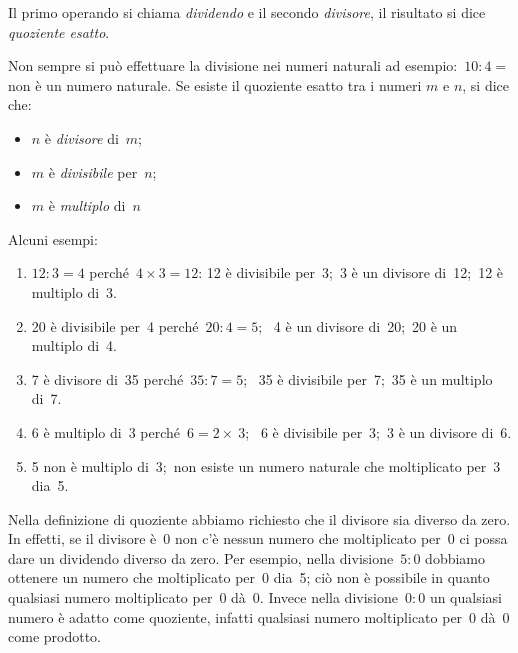 Il primo operando si chiama \emph{dividendo} e il secondo \emph{divisore}, 
il risultato si dice \emph{quoziente esatto}.

Non sempre si può effettuare la divisione nei numeri naturali ad 
esempio:~\(10 : 4 =\) non è un numero naturale.
Se esiste il quoziente esatto tra i numeri \(m\) e \(n\), si dice che:

\begin{multicols}{3}
\begin{itemize} [noitemsep]
 \item \(n\) è \emph{divisore} di~\(m\);
 \item \(m\) è \emph{divisibile} per~\(n\);
 \item \(m\) è \emph{multiplo} di~\(n\)
\end{itemize}
\end{multicols}


 \begin{esempio}
Alcuni esempi:
\begin{enumerate} [noitemsep]
\item \(12:3=4\) perché~\(4 \times 3 = 12\): 
12 è divisibile per~3;~3 è un divisore di~12;~12 è multiplo di~3.
\item 20 è divisibile per~4 perché~\(20:4=5\);~
4 è un divisore di~20;~20 è un multiplo di~4.
\item 7 è divisore di~35 perché~\(35:7=5\);~ 
35 è divisibile per~7;~35 è un multiplo di~7.
\item 6 è multiplo di~3 perché~\(6=2\times~3\);~
6 è divisibile per~3;~3 è un divisore di~6.
\item 5 non è multiplo di~3;~non esiste un numero naturale che moltiplicato 
per~3 dia~5.
\end{enumerate}
\end{esempio}

\osservazione Nella definizione di quoziente abbiamo richiesto che il 
divisore sia diverso da zero. In effetti, se il divisore è~0 non c'è nessun 
numero che moltiplicato per~0 ci possa dare un dividendo diverso da zero.
Per esempio, nella divisione~\(5:0\) dobbiamo ottenere un numero che 
moltiplicato per~0 dia~5; ciò non è possibile in quanto qualsiasi numero 
moltiplicato per~0 dà~0.
Invece nella divisione~\(0:0\) un qualsiasi numero è adatto come quoziente, 
infatti qualsiasi numero moltiplicato per~0 dà~0 come prodotto.

